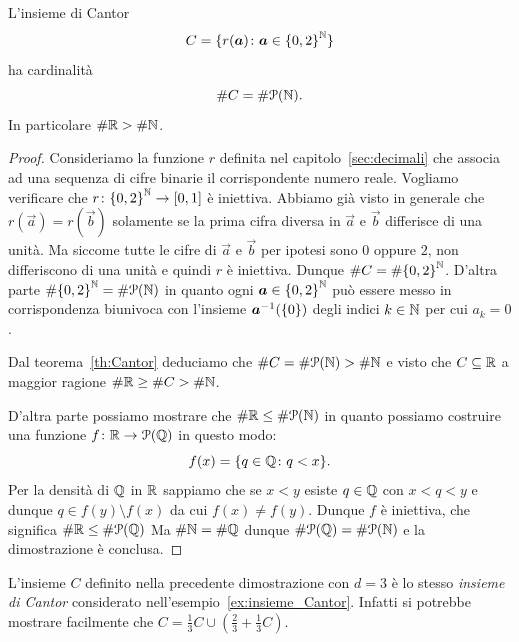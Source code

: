 \begin{theorem}
  \label{th:cantor_secondo}
L'insieme di Cantor
\[
  C = \{r(\boldsymbol a)\colon \boldsymbol a \in {\left\{ 0,2 \right\}}^{\mathbb N}\}
\]
ha cardinalità
\[
\# C = \# \mathcal P({\mathbb N}).
\]
In particolare $\#{\mathbb R} > \#{\mathbb N}$.
\end{theorem}
%
\begin{proof}
Consideriamo la funzione $r$ definita nel capitolo~\ref{sec:decimali} che associa 
ad una sequenza di cifre binarie il corrispondente numero reale.
Vogliamo verificare che $r\colon {\left\{ 0,2 \right\}}^{\mathbb N} \to \left[0,1\right]$
è iniettiva.
Abbiamo già visto in generale che $r(\vec a) = r(\vec b)$ solamente 
se la prima cifra diversa in $\vec a$ e $\vec b$ differisce di una unità.
Ma siccome tutte le cifre di $\vec a$ e $\vec b$ per ipotesi sono $0$ oppure 
$2$, non differiscono di una unità e quindi $r$ è iniettiva.
Dunque $\# C = \#{\left\{ 0,2 \right\}}^{\mathbb N}$.
D'altra parte $\#{\left\{ 0,2 \right\}}^{\mathbb N} = \#\mathcal P({\mathbb N})$ in quanto 
ogni $\boldsymbol a \in {\left\{ 0,2 \right\}}^{\mathbb N}$ può essere messo in corrispondenza 
biunivoca con l'insieme $\boldsymbol a^{-1}({\left\{ 0 \right\}})$ degli indici $k\in {\mathbb N}$
per cui $a_k=0$.

Dal teorema~\ref{th:Cantor} deduciamo che $\# C = \#\mathcal P({\mathbb N}) > \#{\mathbb N}$ 
e visto che $C\subseteq {\mathbb R}$ a maggior ragione $\# {\mathbb R} \ge \# C >\#{\mathbb N}$.

D'altra parte possiamo mostrare che $\#{\mathbb R} \le \# \mathcal P({\mathbb N})$
in quanto possiamo costruire una funzione $f\colon {\mathbb R} \to \mathcal P({\mathbb Q})$
in questo modo:
\[
f(x) = {\left\{ q\in {\mathbb Q}\colon q<x \right\}}.
\]
Per la densità di ${\mathbb Q}$ in ${\mathbb R}$ sappiamo che se $x<y$ 
esiste $q\in {\mathbb Q}$ con $x<q<y$ e dunque $q\in f(y)\setminus f(x)$ 
da cui $f(x)\neq f(y)$. 
Dunque $f$ è iniettiva, che significa $\#{\mathbb R}\le \# \mathcal P({\mathbb Q})$
Ma $\#{\mathbb N} = \#{\mathbb Q}$ dunque $\#\mathcal P({\mathbb Q}) = \#\mathcal P({\mathbb N})$ 
e la dimostrazione è conclusa.
\end{proof}

L'insieme $C$ definito nella precedente dimostrazione con $d=3$ 
è lo stesso \emph{insieme di Cantor}%
%
% 
considerato nell'esempio~\ref{ex:insieme_Cantor}.
Infatti si potrebbe mostrare facilmente che 
$C=\frac 1 3 C \cup (\frac 2 3 + \frac 1 3 C)$.

